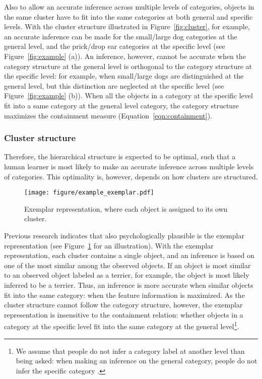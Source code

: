 \documentclass[doc]{apa6}
\begin{document}
Also to allow an accurate inference across multiple levels of categories, objects in the same
cluster have to fit into the same categories at both general and specific levels.  With the cluster
structure illustrated in Figure~\ref{fig:cluster}, for example, an accurate inference can be made
for the small/large dog categories at the general level, and the prick/drop ear categories at the
specific level (see Figure~\ref{fig:example} (a)). An inference, however, cannot be accurate when the
category structure at the general level is orthogonal to the category structure at the specific
level: for example, when small/large dogs are distinguished at the general level, but this
distinction are neglected at the specific level (see Figure~\ref{fig:example} (b)).  When all the
objects in a category at the specific level fit into a same category at the general level category,
the category structure maximizes the containment measure (Equation~\ref{eqn:containment}).

\subsubsection*{Cluster structure}

Therefore, the hierarchical structure is expected to be optimal, such that a human learner is most
likely to make an accurate inference across multiple levels of categories.  This optimality is,
however, depends on how clusters are structured.

\begin{figure}
    \centering

    \texttt{[image: figure/example\_exemplar.pdf]}
    \vspace{6pt}

    \caption{Exemplar representation, where each object is assigned to its own cluster.}

\label{fig:exemplar}
\end{figure}

Previous research indicates that also psychologically plausible is the exemplar representation
\parencite{Nosofsky1986a, Nosofsky1991a} (see Figure~\ref{fig:exemplar} for an illustration).  With
the exemplar representation, each cluster contains a single object, and an inference is based on one
of the most similar among the observed objects.  If an object is most similar to an observed object
labeled as a terrier, for example, the object is most likely inferred to be a terrier.  Thus, an
inference is more accurate when similar objects fit into the same category: when the feature
information is maximized.  As the cluster structure cannot follow the category structure, however,
the exemplar representation is insensitive to the containment relation: whether objects in a
category at the specific level fit into the same category at the general level\footnote{We assume
that people do not infer a category label at another level than being asked: when making an
inference on the general category, people do not infer the specific category \parencite[see
however,][]{Nosofsky2015a}.}.
\end{document}
